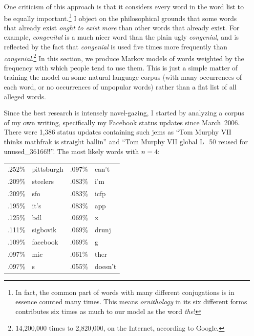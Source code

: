 \documentclass[twocolumn]{article}
\begin{document}
One criticism of this approach is that it considers every word in the
word list to be equally important.\!\footnote{In fact, the common part
  of words with many different conjugations is in essence counted many
  times. This means {\it ornithology} in its six different forms
  contributes six times as much to our model as the word {\it the}!} I
object on the philosophical grounds that some words that already exist
{\em ought to exist more} than other words that already exist. For
example, {\it congenital} is a much nicer word than the plain ugly
{\it congenial}, and is reflected by the fact that {\it congenial} is
used five times more frequently than {\it
  congenial}.\!\footnote{14,200,000 times to 2,820,000, on the
  Internet, according to Google.} In this section, we produce Markov
models of words weighted by the frequency with which people tend to
use them. This is just a simple matter of training the model on some
natural language corpus (with many occurrences of each word, or no
occurrences of unpopular words) rather than a flat list of all alleged
words.

Since the best research is intensely navel-gazing, I started by 
analyzing a corpus of my own writing, specifically my Facebook status
updates since March~2006. There were 1,386 status updates containing
such jems as ``Tom Murphy VII thinks mathfrak is straight ballin''
and ``Tom Murphy VII global L\_50 reused for unused\_36166!!''. The
most likely words with $n=4$:

\begin{center}
\begin{tabular}{rl@{\quad\quad}rl}
.252\% &  pittsburgh   & .097\% &  can't    \\   
.209\% &  steelers     & .083\% &  i'm      \\   
.209\% &  sfo          & .083\% &  icfp     \\   
.195\% &  it's         & .083\% &  app      \\   
.125\% &  bdl          & .069\% &  x        \\   
.111\% &  sigbovik     & .069\% &  drunj    \\   
.109\% &  facebook     & .069\% &  g        \\   
.097\% &  mic          & .061\% &  ther     \\   
.097\% &  s            & .055\% &  doesn't  \\
\end{tabular}
\end{center}
\end{document}
